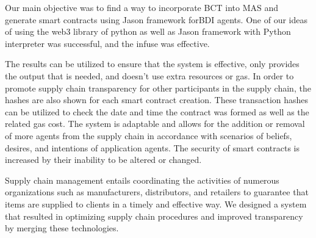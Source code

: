 \vspace{.5cm}

Our main objective was to find a way to incorporate \ac{BCT} into \ac{MAS} and generate smart contracts using Jason framework for\ac{BDI} agents. One of our ideas of using the web3 library of python as well as Jason framework with Python interpreter was successful, and the infuse was effective.

\vspace{.5cm}

The results can be utilized to ensure that the system is effective, only provides the output that is needed, and doesn't use extra resources or gas. In order to promote supply chain transparency for other participants in the supply chain, the hashes are also shown for each smart contract creation. These transaction hashes can be utilized to check the date and time the contract was formed as well as the related gas cost. The system is adaptable and allows for the addition or removal of more agents from the supply chain in accordance with scenarios of beliefs, desires, and intentions of application agents. The security of smart contracts is increased by their inability to be altered or changed.

\vspace{.5cm}

Supply chain management entails coordinating the activities of numerous organizations such as manufacturers, distributors, and retailers to guarantee that items are supplied to clients in a timely and effective way. We designed a system that resulted in optimizing supply chain procedures and improved transparency by merging these technologies.